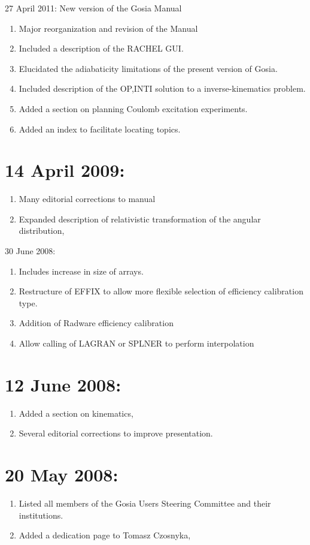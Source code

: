 \documentclass[10pt]{article}
\begin{document}
27 April 2011: New version of the Gosia Manual

\begin{enumerate}
  \item Major reorganization and revision of the Manual
  \item Included a description of the RACHEL GUI.
  \item Elucidated the adiabaticity limitations of the present version of Gosia.
  \item Included description of the OP,INTI solution to a inverse-kinematics problem.
  \item Added a section on planning Coulomb excitation experiments.
  \item Added an index to facilitate locating topics.
\end{enumerate}

\section*{14 April 2009:}
\begin{enumerate}
  \item Many editorial corrections to manual
  \item Expanded description of relativistic transformation of the angular distribution,
\end{enumerate}

30 June 2008:

\begin{enumerate}
  \item Includes increase in size of arrays.
  \item Restructure of EFFIX to allow more flexible selection of efficiency calibration type.
  \item Addition of Radware efficiency calibration
  \item Allow calling of LAGRAN or SPLNER to perform interpolation
\end{enumerate}

\section*{12 June 2008:}
\begin{enumerate}
  \item Added a section on kinematics,
  \item Several editorial corrections to improve presentation.
\end{enumerate}

\section*{20 May 2008:}
\begin{enumerate}
  \item Listed all members of the Gosia Users Steering Committee and their institutions.
  \item Added a dedication page to Tomasz Czosnyka,
\end{enumerate}
\end{document}
